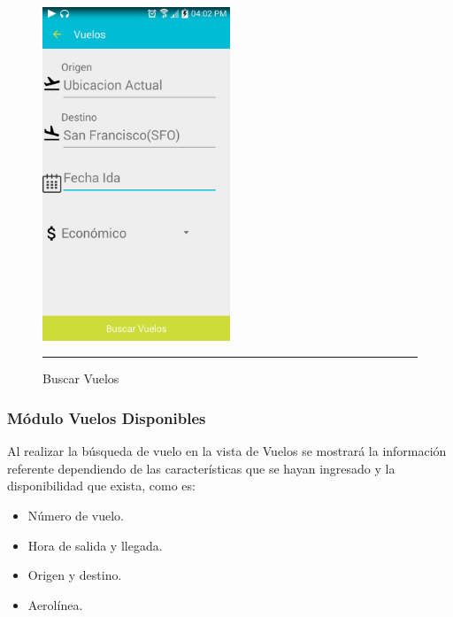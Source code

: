\begin{figure}[h]
	\centering
		\includegraphics[width=0.5\textwidth]{Figuras/buscav.png}
		\rule{30em}{0.5pt}
	\caption[Buscar Vuelos]{Buscar Vuelos}
	\label{fig:vuelos}
\end{figure}
\clearpage

\subsubsection{Módulo Vuelos Disponibles}
Al realizar la búsqueda de vuelo en la vista de Vuelos se mostrará la información referente dependiendo de las características que se hayan ingresado y la disponibilidad que exista, 
como es:
\begin{itemize}
\item Número de vuelo.
\item Hora de salida y llegada.
\item Origen y destino.
\item Aerolínea.
\end{itemize}


